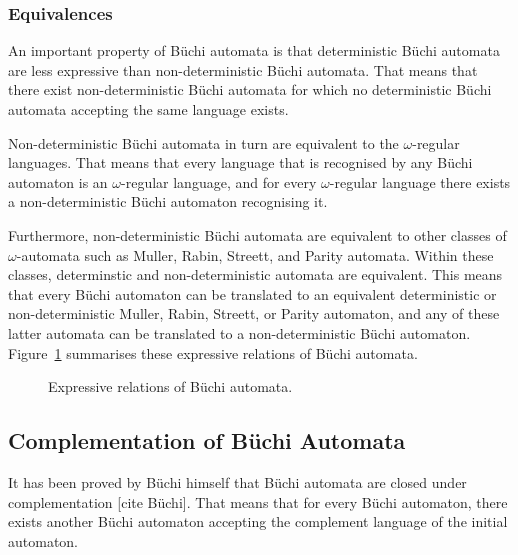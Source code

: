\documentclass{scrreprt}
\newcommand{\om}{{$\omega$}}
\begin{document}
\subsubsection{Equivalences}
An important property of Büchi automata is that deterministic Büchi automata are less expressive than non-deterministic Büchi automata. That means that there exist non-deterministic Büchi automata for which no deterministic Büchi automata accepting the same language exists.

Non-deterministic Büchi automata in turn are equivalent to the \om-regular languages. That means that every language that is recognised by any Büchi automaton is an \om-regular language, and for every \om-regular language there exists a non-deterministic Büchi automaton recognising it.

Furthermore, non-deterministic Büchi automata are equivalent to other classes of \om-automata such as Muller, Rabin, Streett, and Parity automata. Within these classes, determinstic and non-deterministic automata are equivalent. This means that every Büchi automaton can be translated to an equivalent deterministic or non-deterministic Muller, Rabin, Streett, or Parity automaton, and any of these latter automata can be translated to a non-deterministic Büchi automaton. Figure~\ref{equivalences} summarises these expressive relations of Büchi automata.

\begin{figure}[htb]
\begin{center}
\caption{Expressive relations of Büchi automata.}
\label{equivalences}
\end{center}
\end{figure}

\subsection{Complementation of Büchi Automata}
It has been proved by Büchi himself that Büchi automata are closed under complementation [cite Büchi]. That means that for every Büchi automaton, there exists another Büchi automaton accepting the complement language of the initial automaton.
\end{document}

